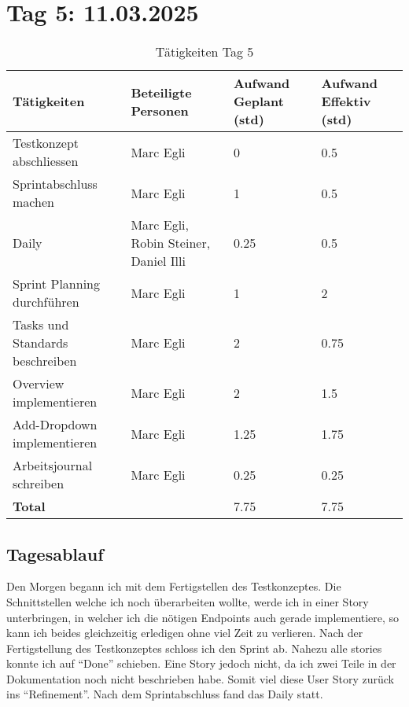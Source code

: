 \section{Tag 5: 11.03.2025}
\begin{table}[H]
    \begin{tabular}{|L{0.4\textwidth}|C{60pt}|C{60pt}|C{60pt}|}
        \hline
        \color{white}Tätigkeiten & \color{white}Beteiligte \color{white}Personen & \color{white}Aufwand Geplant (std) & \color{white}Aufwand Effektiv (std) \\
        \hline
         Testkonzept abschliessen & Marc Egli & 0 & 0.5 \\
        \hline
        Sprintabschluss machen & Marc Egli & 1 & 0.5 \\
        \hline
        Daily & Marc Egli, Robin Steiner, Daniel Illi & 0.25 & 0.5 \\
        \hline
        Sprint Planning durchführen & Marc Egli & 1 & 2 \\
        \hline
        Tasks und Standards beschreiben & Marc Egli & 2 & 0.75 \\
        \hline
        Overview implementieren & Marc Egli & 2 & 1.5 \\
        \hline
        Add-Dropdown implementieren & Marc Egli & 1.25 & 1.75 \\
        \hline
        Arbeitsjournal schreiben & Marc Egli & 0.25 & 0.25 \\
        \textbf{Total} &  & 7.75 & 7.75 \\
        \hline
    \end{tabular}
    \caption{Tätigkeiten Tag 5}
\end{table}

\subsection*{Tagesablauf}
Den Morgen begann ich mit dem Fertigstellen des Testkonzeptes. Die Schnittstellen welche ich noch überarbeiten wollte, werde
ich in einer Story unterbringen, in welcher ich die nötigen Endpoints auch gerade implementiere, so kann ich beides gleichzeitig erledigen 
ohne viel Zeit zu verlieren. Nach der Fertigstellung des Testkonzeptes schloss ich den Sprint ab. Nahezu alle stories konnte ich auf ``Done''
schieben. Eine Story jedoch nicht, da ich zwei Teile in der Dokumentation noch nicht beschrieben habe. Somit viel diese User Story zurück ins 
``Refinement''. Nach dem Sprintabschluss fand das Daily statt.

